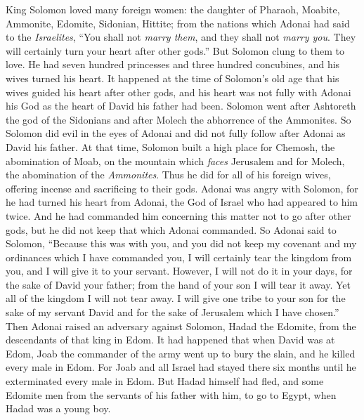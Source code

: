 \begin{biblechapter} %
 King Solomon loved many foreign women: the daughter of Pharaoh, Moabite, Ammonite, Edomite, Sidonian, Hittite;
\verse from the nations which Adonai had said to the \textit{Israelites}, “You shall not \textit{marry them}, and they shall not \textit{marry you}. They will certainly turn your heart after other gods.” But Solomon clung to them to love.
\verse He had seven hundred princesses and three hundred concubines, and his wives turned his heart.
 It happened at the time of Solomon’s old age that his wives guided his heart after other gods, and his heart was not fully with Adonai his God as the heart of David his father had been.
\verse Solomon went after Ashtoreth the god of the Sidonians and after Molech the abhorrence of the Ammonites.
\verse So Solomon did evil in the eyes of Adonai and did not fully follow after Adonai as David his father.
\verse At that time, Solomon built a high place for Chemosh, the abomination of Moab, on the mountain which \textit{faces} Jerusalem and for Molech, the abomination of the \textit{Ammonites}.
\verse Thus he did for all of his foreign wives, offering incense and sacrificing to their gods.
 Adonai was angry with Solomon, for he had turned his heart from Adonai, the God of Israel who had appeared to him twice.
\verse And he had commanded him concerning this matter not to go after other gods, but he did not keep that which Adonai commanded.
\verse So Adonai said to Solomon, “Because this was with you, and you did not keep my covenant and my ordinances which I have commanded you, I will certainly tear the kingdom from you, and I will give it to your servant.
\verse However, I will not do it in your days, for the sake of David your father; from the hand of your son I will tear it away.
\verse Yet all of the kingdom I will not tear away. I will give one tribe to your son for the sake of my servant David and for the sake of Jerusalem which I have chosen.”
\verse Then Adonai raised an adversary against Solomon, Hadad the Edomite, from the descendants of that king in Edom.
\verse It had happened that when David was at Edom, Joab the commander of the army went up to bury the slain, and he killed every male in Edom.
\verse For Joab and all Israel had stayed there six months until he exterminated every male in Edom.
\verse But Hadad himself had fled, and some Edomite men from the servants of his father with him, to go to Egypt, when Hadad was a young boy.

\end{biblechapter}
